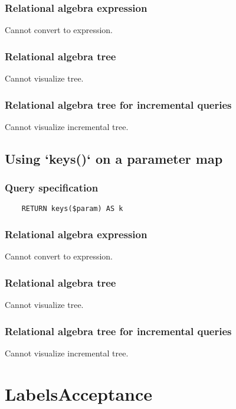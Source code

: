 	\subsubsection*{Relational algebra expression}

	Cannot convert to expression.

	\subsubsection*{Relational algebra tree}

	Cannot visualize tree.

	\subsubsection*{Relational algebra tree for incremental queries}

	Cannot visualize incremental tree.
	\subsection{Using `keys()` on a parameter map}

	\subsubsection*{Query specification}

	\begin{lstlisting}
	RETURN keys($param) AS k
	\end{lstlisting}


	\subsubsection*{Relational algebra expression}

	Cannot convert to expression.

	\subsubsection*{Relational algebra tree}

	Cannot visualize tree.

	\subsubsection*{Relational algebra tree for incremental queries}

	Cannot visualize incremental tree.

	\section{LabelsAcceptance}

